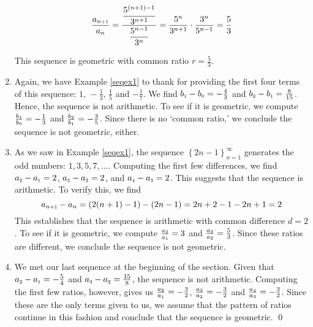 \begin{ex}
\begin{enumerate}
\[ \dfrac{a_{n\mbox{\tiny$ + 1$}}}{a_{n}} = \dfrac{\dfrac{5^{(n+1)-1}}{3^{n+1}}}{\dfrac{5^{n-1}}{3^{n}}} = \dfrac{5^{n}}{3^{n+1}} \cdot \dfrac{3^{n}}{5^{n-1}} = \dfrac{5}{3} \]

This sequence is geometric with common ratio $r = \frac{5}{3}$.

\item Again, we have Example \ref{seqex1} to thank for providing the first four terms of this sequence: $1, \, -\frac{1}{3}, \, \frac{1}{5}$ and $-\frac{1}{7}$.  We find $b_{\mbox{\tiny$1$}} - b_{\mbox{\tiny$0$}} =  -\frac{4}{3}$ and $b_{\mbox{\tiny$2$}} - b_{\mbox{\tiny$1$}} = \frac{8}{15}$.  Hence, the sequence is not arithmetic.  To see if it is geometric, we compute $\frac{b_{\mbox{\tiny$1$}}}{b_{\mbox{\tiny$0$}}} = -\frac{1}{3}$ and $\frac{b_{\mbox{\tiny$2$}}}{b_{\mbox{\tiny$1$}}} = -\frac{3}{5}$.  Since there is no `common ratio,' we conclude the sequence is not geometric, either.

\item  As we saw in Example \ref{seqex1}, the sequence $\left\{ 2n - 1 \right\}_{n=1}^{\infty}$ generates the odd numbers:  $1, 3, 5, 7, \ldots$.  Computing the first few differences, we find $a_{\mbox{\tiny$2$}} - a_{\mbox{\tiny$1$}} = 2$, $a_{\mbox{\tiny$3$}} - a_{\mbox{\tiny$2$}} = 2$, and $a_{\mbox{\tiny$4$}} - a_{\mbox{\tiny$3$}} = 2$.  This suggests that the sequence is arithmetic.  To verify this, we find \[a_{n \mbox{\tiny$ + 1$}} - a_{n} = (2(n+1)-1) - (2n-1) = 2n+2-1-2n+1 = 2\]  This establishes that the sequence is arithmetic with common difference $d = 2$.  To see if it is geometric, we compute $\frac{a_{\mbox{\tiny$2$}}}{a_{\mbox{\tiny$1$}}} = 3$ and  $\frac{a_{\mbox{\tiny$3$}}}{a_{\mbox{\tiny$2$}}} = \frac{5}{3}$.  Since these ratios are different, we conclude the sequence is not geometric.

\item  We met our last sequence at the beginning of the section.  Given that $a_{\mbox{\tiny$2$}} - a_{\mbox{\tiny$1$}} = -\frac{5}{4}$ and $a_{\mbox{\tiny$3$}} - a_{\mbox{\tiny$2$}} = \frac{15}{8}$, the sequence is not arithmetic.  Computing the first few ratios, however, gives us $\frac{a_{\mbox{\tiny$2$}}}{a_{\mbox{\tiny$1$}}} = -\frac{3}{2}$, $\frac{a_{\mbox{\tiny$3$}}}{a_{\mbox{\tiny$2$}}} = -\frac{3}{2}$ and $\frac{a_{\mbox{\tiny$4$}}}{a_{\mbox{\tiny$3$}}} = -\frac{3}{2}$.  Since these are the only terms given to us, we assume that the pattern of ratios continue in this fashion and conclude that the sequence is geometric. \qed

\end{enumerate}


\end{ex}

